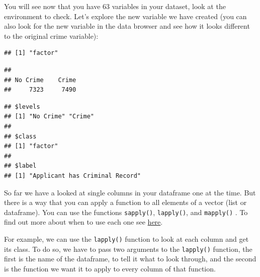 \documentclass[]{book}
\newenvironment{Shaded}{\begin{snugshade}}{\end{snugshade}}
\newcommand{\KeywordTok}[1]{\textcolor[rgb]{0.13,0.29,0.53}{\textbf{#1}}}
\newcommand{\NormalTok}[1]{#1}
\newcommand{\OperatorTok}[1]{\textcolor[rgb]{0.81,0.36,0.00}{\textbf{#1}}}
\theoremstyle{definition}
\theoremstyle{definition}
\theoremstyle{definition}
\theoremstyle{remark}
\begin{document}
You will see now that you have 63 variables in your dataset, look at the
environment to check. Let's explore the new variable we have created
(you can also look for the new variable in the data browser and see how
it looks different to the original crime variable):

\begin{Shaded}
\end{Shaded}

\begin{verbatim}
## [1] "factor"
\end{verbatim}

\begin{Shaded}
\end{Shaded}

\begin{verbatim}
## 
## No Crime    Crime 
##     7323     7490
\end{verbatim}

\begin{Shaded}
\end{Shaded}

\begin{verbatim}
## $levels
## [1] "No Crime" "Crime"   
## 
## $class
## [1] "factor"
## 
## $label
## [1] "Applicant has Criminal Record"
\end{verbatim}

So far we have a looked at single columns in your dataframe one at the
time. But there is a way that you can apply a function to all elements
of a vector (list or dataframe). You can use the functions
\texttt{sapply()}, \texttt{lapply()}, and \texttt{mapply()} . To find
out more about when to use each one see
\href{https://www.r-bloggers.com/using-apply-sapply-lapply-in-r/}{here}.

For example, we can use the \texttt{lapply()} function to look at each
column and get its class. To do so, we have to pass two arguments to the
\texttt{lapply()} function, the first is the name of the dataframe, to
tell it what to look through, and the second is the function we want it
to apply to every column of that function.
\end{document}
